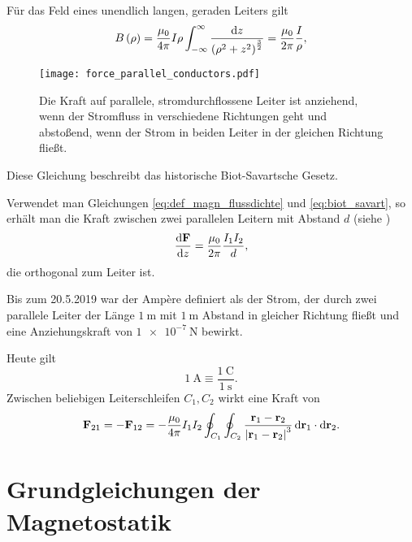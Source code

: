Für das Feld eines unendlich langen, geraden Leiters gilt
\begin{equation}
	\label{eq:biot_savart}
	B\left(\rho \right)=\frac{\mu _{0}}{4\pi }I\rho \int _{-\infty }^{\infty }\frac{\mathop{}\!\mathrm{d} z}{\left(\rho ^{2}+z^{2}\right)^{\frac{3}{2}}}=\frac{\mu _{0}}{2\pi }\frac{I}{\rho },
\end{equation}


\begin{figure}[htb]
	\centering
	\texttt{[image: force\_parallel\_conductors.pdf]}
	\caption{Die Kraft auf parallele, stromdurchflossene Leiter ist anziehend, wenn der Stromfluss in verschiedene Richtungen geht und abstoßend, wenn der Strom in beiden Leiter in der gleichen Richtung fließt. }
	\label{fig:force_parallel_conductors}
\end{figure}

Diese Gleichung beschreibt das historische Biot-Savartsche Gesetz.

Verwendet man Gleichungen \eqref{eq:def_magn_flussdichte} und \eqref{eq:biot_savart}, so erhält man die Kraft zwischen zwei parallelen Leitern mit Abstand $d$ (siehe )
\begin{equation*}
	\frac{\mathop{}\!\mathrm{d}\mathbf{F}}{\mathop{}\!\mathrm{d} z} = \frac{\mu_0}{2\pi} \frac{I_1I_2}d,
\end{equation*}
die orthogonal zum Leiter ist.

Bis zum 20.5.2019 war der Ampère definiert als der Strom, der durch zwei parallele Leiter der Länge $\SI{1}{\m}$ mit $\SI{1}{\m}$ Abstand in gleicher Richtung fließt und eine Anziehungskraft von $\SI{1e-7}{\newton}$ bewirkt.

Heute gilt
\begin{equation*}
	\SI{1}{\ampere}\equiv \frac{\SI{1}{\coulomb}}{\SI{1}{\s}}.
\end{equation*}
Zwischen beliebigen Leiterschleifen $C_{1},C_{2}$ wirkt eine Kraft von
\begin{equation*}
	\mathbf{F}_{21}=-\mathbf{F}_{12}=-\frac{\mu _{0}}{4\pi }I_{1}I_{2}\oint _{C_{1}}\oint _{C_{2}}\frac{\mathbf{r}_{1}-\mathbf{r}_{2}}{\left| \mathbf{r}_{1}-\mathbf{r}_{2}\right| ^{3}}\mathop{}\!\mathrm{d} \mathbf{r}_{1}\cdot \mathop{}\!\mathrm{d} \mathbf{r}_{2}.
\end{equation*}



\section{Grundgleichungen der Magnetostatik}

